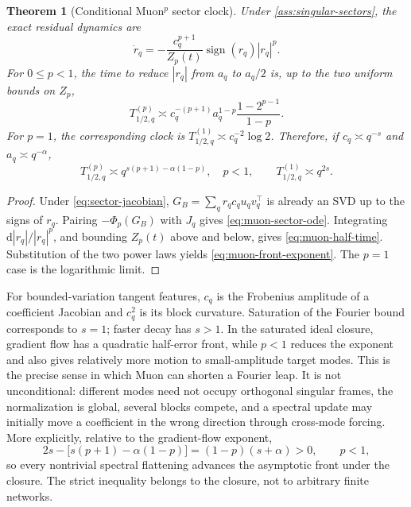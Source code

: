 \documentclass[11pt]{article}
\newcommand{\1}{\mathbf 1}
\newcommand{\dd}{\mathrm d}
\theoremstyle{plain}
\newtheorem{theorem}{Theorem}[section]
\theoremstyle{definition}
\begin{document}
\begin{theorem}[Conditional Muon\texorpdfstring{\({}^p\)}{p} sector clock]
\label{thm:muon-front}
Under \cref{ass:singular-sectors}, the exact residual dynamics are
\begin{equation}
 \dot r_q=-\frac{c_q^{p+1}}{Z_p(t)}
 \operatorname{sign}(r_q)|r_q|^p.
 \label{eq:muon-sector-ode}
\end{equation}
For \(0\leq p<1\), the time to reduce \(|r_q|\) from \(a_q\) to
\(a_q/2\) is, up to the two uniform bounds on \(Z_p\),
\begin{equation}
 T_{1/2,q}^{(p)}\asymp
 c_q^{-(p+1)}a_q^{1-p}
 \frac{1-2^{p-1}}{1-p}.
 \label{eq:muon-half-time}
\end{equation}
For \(p=1\), the corresponding clock is
\(T_{1/2,q}^{(1)}\asymp c_q^{-2}\log2\).  Therefore, if
\(c_q\asymp q^{-s}\) and \(a_q\asymp q^{-\alpha}\),
\begin{equation}
 T_{1/2,q}^{(p)}\asymp
 q^{s(p+1)-\alpha(1-p)},\quad p<1,
 \qquad
 T_{1/2,q}^{(1)}\asymp q^{2s}.
 \label{eq:muon-front-exponent}
\end{equation}
\end{theorem}

\begin{proof}
Under \eqref{eq:sector-jacobian},
\(G_B=\sum_qr_qc_qu_qv_q^\top\) is already an SVD up to the signs of
\(r_q\).  Pairing \(-\Phi_p(G_B)\) with \(J_q\) gives
\eqref{eq:muon-sector-ode}.  Integrating
\(\dd |r_q|/|r_q|^p\), and bounding \(Z_p(t)\) above and below, gives
\eqref{eq:muon-half-time}.  Substitution of the two power laws yields
\eqref{eq:muon-front-exponent}.  The \(p=1\) case is the logarithmic limit.
\end{proof}

For bounded-variation tangent features, \(c_q\) is the Frobenius amplitude
of a coefficient Jacobian and \(c_q^2\) is its block curvature.  Saturation
of the Fourier bound corresponds to \(s=1\); faster decay has \(s>1\).  In
the saturated ideal closure, gradient flow has a quadratic half-error
front, while \(p<1\) reduces the exponent and also gives relatively more
motion to small-amplitude target modes.  This is the precise sense in which
Muon can shorten a Fourier leap.  It is not unconditional: different modes
need not occupy orthogonal singular frames, the normalization is global,
several blocks compete, and a spectral update may initially move a
coefficient in the wrong direction through cross-mode forcing.
More explicitly, relative to the gradient-flow exponent,
\begin{equation}
 2s-\big[s(p+1)-\alpha(1-p)\big]
 =(1-p)(s+\alpha)>0,\qquad p<1,
 \label{eq:muon-exponent-gain}
\end{equation}
so every nontrivial spectral flattening advances the asymptotic front under
the closure.  The strict inequality belongs to the closure, not to arbitrary
finite networks.
\end{document}
